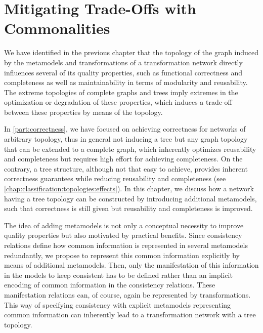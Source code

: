 \chapter{Mitigating Trade-Offs with Commonalities 
}
\label{chap:improvement}

We have identified in the previous chapter that the topology of the graph induced by the metamodels and transformations of a transformation network directly influences several of its quality properties, such as functional correctness and completeness as well as maintainability in terms of modularity and reusability.
The extreme topologies of complete graphs and trees imply extremes in the optimization or degradation of these properties, which induces a trade-off between these properties by means of the topology.

In \autoref{part:correctness}, we have focused on achieving correctness for networks of arbitrary topology, thus in general not inducing a tree but any graph topology that can be extended to a complete graph, which inherently optimizes reusability and completeness but requires high effort for achieving completeness.
On the contrary, a tree structure, although not that easy to achieve, provides inherent correctness guarantees while reducing reusability and completeness (see \autoref{chap:classification:topologies:effects}).
In this chapter, we discuss how a network having a tree topology can be constructed by introducing additional metamodels, such that correctness is still given but reusability and completeness is improved.

The idea of adding metamodels is not only a conceptual necessity to improve quality properties but also motivated by practical benefits.
Since consistency relations define how common information is represented in several metamodels redundantly, we propose to represent this common information explicitly by means of additional metamodels.
Then, only the manifestation of this information in the models to keep consistent has to be defined rather than an implicit encoding of common information in the consistency relations.
These manifestation relations can, of course, again be represented by transformations.
This way of specifying consistency with explicit metamodels representing common information can inherently lead to a transformation network with a tree topology.


